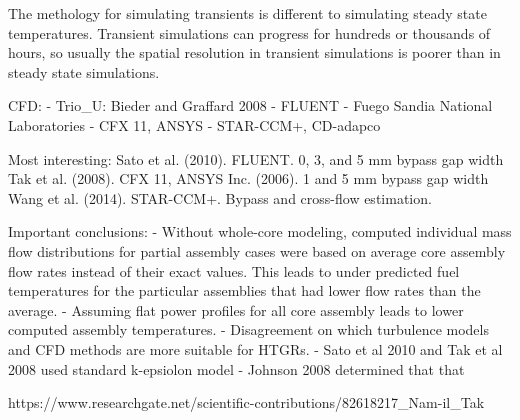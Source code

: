 The methology for simulating transients is different to simulating steady state temperatures.
Transient simulations can progress for hundreds or thousands of hours, so usually the spatial resolution in transient simulations is poorer than in steady state simulations.

CFD:
- Trio_U: Bieder and Graffard 2008 %
- FLUENT
- Fuego Sandia National Laboratories
- CFX 11, ANSYS
- STAR-CCM+, CD-adapco

Most interesting:
Sato et al. (2010). FLUENT.  0, 3, and 5 mm bypass gap width
Tak et al. (2008). CFX 11, ANSYS Inc. (2006). 1 and 5 mm bypass gap width
Wang et al. (2014). STAR-CCM+. Bypass and cross-flow estimation.

Important conclusions:
- Without whole-core modeling, computed individual mass flow distributions for partial assembly cases were based on average core assembly flow rates instead of their exact values.
This leads to under predicted fuel temperatures for the particular assemblies that had lower flow rates than the average.
- Assuming flat power profiles for all core assembly leads to lower computed assembly temperatures.
- Disagreement on which turbulence models and CFD methods are more suitable for HTGRs.
	- Sato et al 2010 and Tak et al 2008 used standard k-epsiolon model
	- Johnson 2008 determined that that

% 
https://www.researchgate.net/scientific-contributions/82618217_Nam-il_Tak




